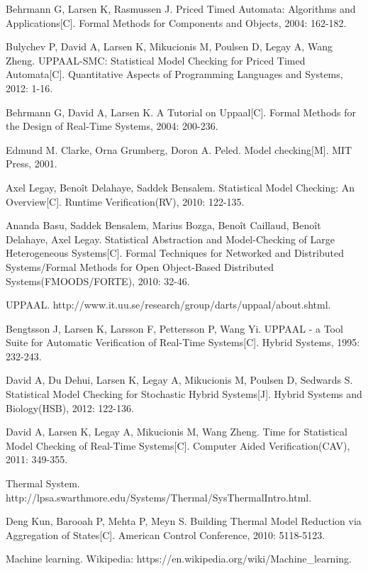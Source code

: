\begin{thebibliography}{zz}
Behrmann G, Larsen K, Rasmussen J. Priced Timed Automata: Algorithms and Applications[C]. Formal Methods for Components and Objects, 2004: 162-182.

Bulychev P, David A, Larsen K, Mikucionis M, Poulsen D, Legay A, Wang Zheng. UPPAAL-SMC: Statistical Model Checking for Priced Timed Automata[C]. Quantitative Aspects of Programming Languages and Systems, 2012: 1-16.

Behrmann G, David A, Larsen K. A Tutorial on Uppaal[C]. Formal Methods for the Design of Real-Time Systems, 2004: 200-236.

Edmund M. Clarke, Orna Grumberg, Doron A. Peled. Model checking[M]. MIT Press, 2001.

Axel Legay, Benoît Delahaye, Saddek Bensalem. Statistical Model Checking: An Overview[C]. Runtime Verification(RV), 2010: 122-135.

Ananda Basu, Saddek Bensalem, Marius Bozga, Benoît Caillaud, Benoît Delahaye, Axel Legay. Statistical Abstraction and Model-Checking of Large Heterogeneous Systems[C]. Formal Techniques for Networked and Distributed Systems/Formal Methods for Open Object-Based Distributed Systems(FMOODS/FORTE), 2010: 32-46.

UPPAAL. http://www.it.uu.se/research/group/darts/uppaal/about.shtml.

Bengtsson J, Larsen K, Larsson F, Pettersson P, Wang Yi. UPPAAL - a Tool Suite for Automatic Verification of Real-Time Systems[C]. Hybrid Systems, 1995: 232-243.

David A, Du Dehui, Larsen K, Legay A, Mikucionis M, Poulsen D, Sedwards S. Statistical Model Checking for Stochastic Hybrid Systems[J]. Hybrid Systems and Biology(HSB), 2012: 122-136.

David A, Larsen K, Legay A, Mikucionis M, Wang Zheng. Time for Statistical Model Checking of Real-Time Systems[C]. Computer Aided Verification(CAV), 2011: 349-355.

Thermal System. http://lpsa.swarthmore.edu/Systems/Thermal/SysThermalIntro.html.

Deng Kun, Barooah P, Mehta P, Meyn S. Building Thermal Model Reduction via Aggregation of States[C]. American Control Conference, 2010: 5118-5123.

Machine learning. Wikipedia: https://en.wikipedia.org/wiki/Machine\_learning.


\end{thebibliography}
